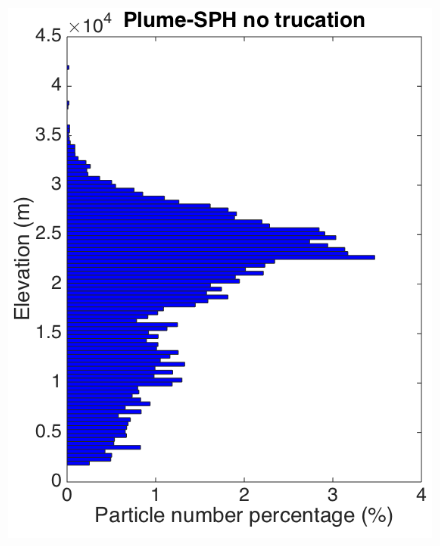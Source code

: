 \begin{figure}[!htb]
    \centering
    \begin{minipage}{.247\textwidth}
        \centering
        \includegraphics[width=0.99 \textwidth]{Chapter-7/Figures/Plume-SPH-ParticleDis-NoTrucation-z}
    \end{minipage}%
    \begin{minipage}{.247 \textwidth}
        \centering

\end{minipage}
\end{figure}
